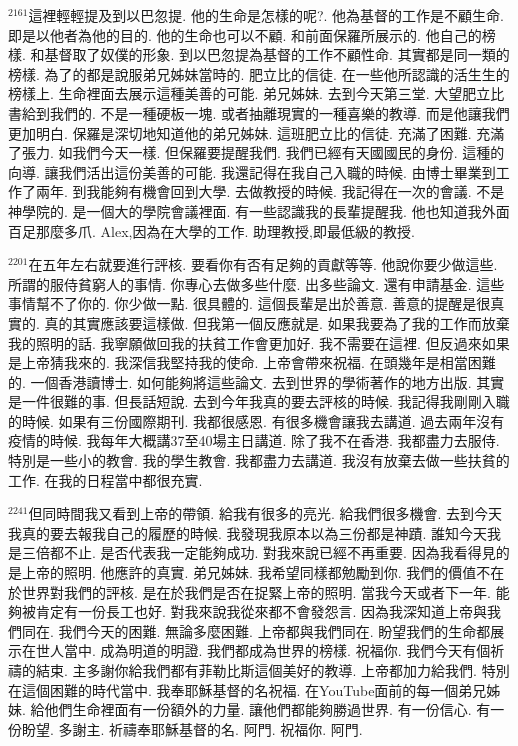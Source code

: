 \documentclass{book}
\begin{document}
$^{2161}$這裡輕輕提及到以巴忽提.
他的生命是怎樣的呢?.
他為基督的工作是不顧生命.
即是以他者為他的目的.
他的生命也可以不顧.
和前面保羅所展示的.
他自己的榜樣.
和基督取了奴僕的形象.
到以巴忽提為基督的工作不顧性命.
其實都是同一類的榜樣.
為了的都是說服弟兄姊妹當時的.
肥立比的信徒.
在一些他所認識的活生生的榜樣上.
生命裡面去展示這種美善的可能.
弟兄姊妹.
去到今天第三堂.
大望肥立比書給到我們的.
不是一種硬板一塊.
或者抽離現實的一種喜樂的教導.
而是他讓我們更加明白.
保羅是深切地知道他的弟兄姊妹.
這班肥立比的信徒.
充滿了困難.
充滿了張力.
如我們今天一樣.
但保羅要提醒我們.
我們已經有天國國民的身份.
這種的向導.
讓我們活出這份美善的可能.
我還記得在我自己入職的時候.
由博士畢業到工作了兩年.
到我能夠有機會回到大學.
去做教授的時候.
我記得在一次的會議.
不是神學院的.
是一個大的學院會議裡面.
有一些認識我的長輩提醒我.
他也知道我外面百足那麼多爪.
Alex,因為在大學的工作.
助理教授,即最低級的教授.

$^{2201}$在五年左右就要進行評核.
要看你有否有足夠的貢獻等等.
他說你要少做這些.
所謂的服侍貧窮人的事情.
你專心去做多些什麼.
出多些論文.
還有申請基金.
這些事情幫不了你的.
你少做一點.
很具體的.
這個長輩是出於善意.
善意的提醒是很真實的.
真的其實應該要這樣做.
但我第一個反應就是.
如果我要為了我的工作而放棄我的照明的話.
我寧願做回我的扶貧工作會更加好.
我不需要在這裡.
但反過來如果是上帝猜我來的.
我深信我堅持我的使命.
上帝會帶來祝福.
在頭幾年是相當困難的.
一個香港讀博士.
如何能夠將這些論文.
去到世界的學術著作的地方出版.
其實是一件很難的事.
但長話短說.
去到今年我真的要去評核的時候.
我記得我剛剛入職的時候.
如果有三份國際期刊.
我都很感恩.
有很多機會讓我去講道.
過去兩年沒有疫情的時候.
我每年大概講37至40場主日講道.
除了我不在香港.
我都盡力去服侍.
特別是一些小的教會.
我的學生教會.
我都盡力去講道.
我沒有放棄去做一些扶貧的工作.
在我的日程當中都很充實.

$^{2241}$但同時間我又看到上帝的帶領.
給我有很多的亮光.
給我們很多機會.
去到今天我真的要去報我自己的履歷的時候.
我發現我原本以為三份都是神蹟.
誰知今天我是三倍都不止.
是否代表我一定能夠成功.
對我來說已經不再重要.
因為我看得見的是上帝的照明.
他應許的真實.
弟兄姊妹.
我希望同樣都勉勵到你.
我們的價值不在於世界對我們的評核.
是在於我們是否在捉緊上帝的照明.
當我今天或者下一年.
能夠被肯定有一份長工也好.
對我來說我從來都不會發怨言.
因為我深知道上帝與我們同在.
我們今天的困難.
無論多麼困難.
上帝都與我們同在.
盼望我們的生命都展示在世人當中.
成為明道的明證.
我們都成為世界的榜樣.
祝福你.
我們今天有個祈禱的結束.
主多謝你給我們都有菲勒比斯這個美好的教導.
上帝都加力給我們.
特別在這個困難的時代當中.
我奉耶穌基督的名祝福.
在YouTube面前的每一個弟兄姊妹.
給他們生命裡面有一份額外的力量.
讓他們都能夠勝過世界.
有一份信心.
有一份盼望.
多謝主.
祈禱奉耶穌基督的名.
阿門.
祝福你.
阿門.
\end{document}
